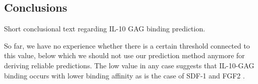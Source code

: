 \subsection{Conclusions}
Short conclusional text regarding IL-10 GAG binding prediction.

 So far, we have no experience whether
there is a certain threshold connected to this value, below which we should not use our prediction method anymore for deriving reliable predictions.
The low value in any case suggests that IL-10-GAG binding occurs with lower
binding affinity as is the case of  SDF-1 and FGF2 .


